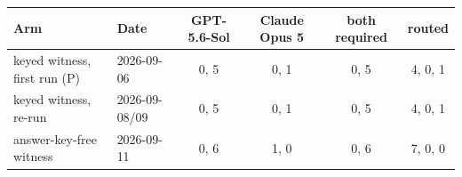 \begingroup\scriptsize\setlength{\tabcolsep}{4pt}
\begin{tabular}{@{}llcccc@{}}
\toprule
Arm & Date & GPT-5.6-Sol & Claude Opus 5 & both required & routed \\
\midrule
keyed witness, first run (P) & 2026-09-06 & 0, 5 & 0, 1 & 0, 5 & 4, 0, 1 \\
keyed witness, re-run & 2026-09-08/09 & 0, 5 & 0, 1 & 0, 5 & 4, 0, 1 \\
answer-key-free witness & 2026-09-11 & 0, 6 & 1, 0 & 0, 6 & 7, 0, 0 \\
\bottomrule
\end{tabular}
\endgroup
